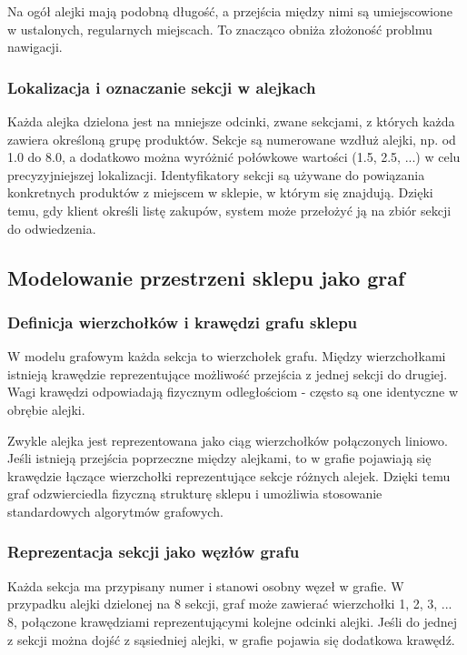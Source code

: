 Na ogół alejki mają podobną długość, a przejścia między nimi są umiejscowione w ustalonych, regularnych miejscach. To znacząco obniża złożoność problmu nawigacji.
\subsubsection{Lokalizacja i oznaczanie sekcji w alejkach}
Każda alejka dzielona jest na mniejsze odcinki, zwane sekcjami, z których każda zawiera określoną grupę produktów. Sekcje są numerowane wzdłuż alejki, np. od 1.0 do 8.0, a dodatkowo można wyróżnić połówkowe wartości (1.5, 2.5, ...) w celu precyzyjniejszej lokalizacji. Identyfikatory sekcji są używane do powiązania konkretnych produktów z miejscem w sklepie, w którym się znajdują. Dzięki temu, gdy klient określi listę zakupów, system może przełożyć ją na zbiór sekcji do odwiedzenia.

\subsection{Modelowanie przestrzeni sklepu jako graf}

\subsubsection{Definicja wierzchołków i krawędzi grafu sklepu}
W modelu grafowym każda sekcja to wierzchołek grafu. Między wierzchołkami istnieją krawędzie reprezentujące możliwość przejścia z jednej sekcji do drugiej. Wagi krawędzi odpowiadają fizycznym odległościom - często są one identyczne w obrębie alejki.

Zwykle alejka jest reprezentowana jako ciąg wierzchołków połączonych liniowo. Jeśli istnieją przejścia poprzeczne między alejkami, to w grafie pojawiają się krawędzie łączące wierzchołki reprezentujące sekcje różnych alejek. Dzięki temu graf odzwierciedla fizyczną strukturę sklepu i umożliwia stosowanie standardowych algorytmów grafowych.

\subsubsection{Reprezentacja sekcji jako węzłów grafu}
Każda sekcja ma przypisany numer i stanowi osobny węzeł w grafie. W przypadku alejki dzielonej na 8 sekcji, graf może zawierać wierzchołki 1, 2, 3, ... 8, połączone krawędziami reprezentującymi kolejne odcinki alejki. Jeśli do jednej z sekcji można dojść z sąsiedniej alejki, w grafie pojawia się dodatkowa krawędź.

